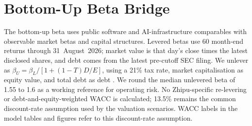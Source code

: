 \documentclass[11pt]{article}
\begin{document}
\begin{table}[H]
\centering
\caption{Base-case projection (US\$ millions unless noted).}
\end{table}

\clearpage
\section{Bottom-Up Beta Bridge}
\label{sec:beta}
The bottom-up beta uses public software and AI-infrastructure comparables with observable market betas and
capital structures. Levered betas use 60 month-end returns through 31~August~2026; market value is that day's
close times the latest disclosed shares, and debt comes from the latest pre-cutoff SEC filing. We unlever as
$\beta_U=\beta_L/[1+(1-T)D/E]$, using a 21\% tax rate, market capitalisation as equity value, and total debt
as debt \citep{nasdaqsec2026}. We round the median unlevered beta of 1.55 to 1.6 as a working reference
for operating risk. No Zhipu-specific re-levering or debt-and-equity-weighted WACC is calculated;
13.5\% remains the common discount-rate assumption used by the valuation scenarios. WACC labels
in the model tables and figures refer to this discount-rate assumption.
\end{document}
